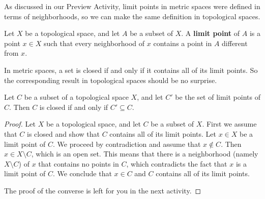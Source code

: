 



As discussed in our Preview Activity, limit points in metric spaces were defined in terms of neighborhoods, so we can make the same definition in topological spaces. 



\begin{definition} Let $X$ be a topological space, and let $A$ be a subset of $X$. A \textbf{limit point} of $A$ is a point $x \in X$ such that every neighborhood of $x$ contains a point in $A$ different from $x$. 
\end{definition}



In metric spaces, a set is closed if and only if it contains all of its limit points. So the corresponding result in topological spaces should be no surprise. 



\begin{theorem} \label{thm:TS_closed_limitpoints} Let $C$ be a subset of a topological space $X$, and let $C'$ be the set of limit points of $C$. Then $C$ is closed if and only if $C' \subseteq C$.  
\end{theorem}

\begin{proof} Let $X$ be a topological space, and let $C$ be a subset of $X$. First we assume that $C$ is closed and show that $C$ contains all of its limit points. Let $x \in X$ be a limit point of $C$. We proceed by contradiction and assume that $x \notin C$. Then $x \in X \setminus C$, which is an open set. This means that there is a neighborhood (namely $X \setminus C$) of $x$ that contains no points in $C$, which contradicts the fact that $x$ is a limit point of $C$. We conclude that $x \in C$ and $C$ contains all of its limit points.

The proof of the converse is left for you in the next activity. 
\end{proof}



